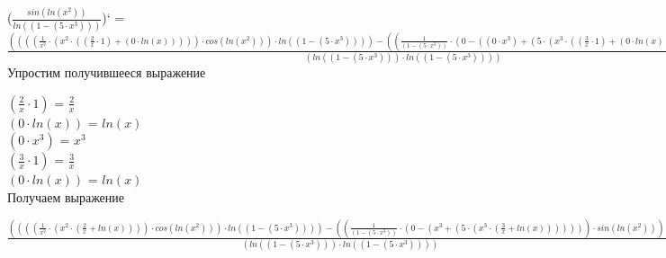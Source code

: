 \documentclass[12pt,a4paper,fleqn]{article}
\begin{document}
($\frac{sin(ln(x^{2}))}{ln((1 - (5 \cdot x^{3})))}$)` = $\frac{((((\frac{1}{x^{2}} \cdot (x^{2} \cdot ((\frac{2}{x} \cdot 1) + (0 \cdot ln(x))))) \cdot cos(ln(x^{2}))) \cdot ln((1 - (5 \cdot x^{3})))) - ((\frac{1}{(1 - (5 \cdot x^{3}))} \cdot (0 - ((0 \cdot x^{3}) + (5 \cdot (x^{3} \cdot ((\frac{3}{x} \cdot 1) + (0 \cdot ln(x)))))))) \cdot sin(ln(x^{2}))))}{(ln((1 - (5 \cdot x^{3}))) \cdot ln((1 - (5 \cdot x^{3}))))}$\\


Упростим получившееся выражение

$(\frac{2}{x} \cdot 1)$ = $\frac{2}{x}$\\
$(0 \cdot ln(x))$ = $ln(x)$\\
$(0 \cdot x^{3})$ = $x^{3}$\\
$(\frac{3}{x} \cdot 1)$ = $\frac{3}{x}$\\
$(0 \cdot ln(x))$ = $ln(x)$\\


 Получаем выражение

$\frac{((((\frac{1}{x^{2}} \cdot (x^{2} \cdot (\frac{2}{x} + ln(x)))) \cdot cos(ln(x^{2}))) \cdot ln((1 - (5 \cdot x^{3})))) - ((\frac{1}{(1 - (5 \cdot x^{3}))} \cdot (0 - (x^{3} + (5 \cdot (x^{3} \cdot (\frac{3}{x} + ln(x))))))) \cdot sin(ln(x^{2}))))}{(ln((1 - (5 \cdot x^{3}))) \cdot ln((1 - (5 \cdot x^{3}))))}$
\end{document}
